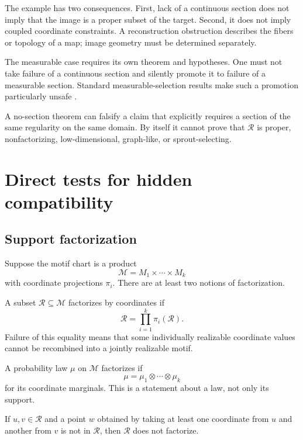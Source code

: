 \documentclass[11pt]{article}
\newcommand{\Image}{\mathcal R}
\newcommand{\Motif}{\mathcal M}
\begin{document}
The example has two consequences.  First, lack of a continuous section does
not imply that the image is a proper subset of the target.  Second, it does
not imply coupled coordinate constraints.  A reconstruction obstruction
describes the fibers or topology of a map; image geometry must be determined
separately.

The measurable case requires its own theorem and hypotheses.  One must not
take failure of a continuous section and silently promote it to failure of a
measurable section.  Standard measurable-selection results make such a
promotion particularly unsafe \cite{kechris1995}.

\begin{corollary}
A no-section theorem can falsify a claim that explicitly requires a section
of the same regularity on the same domain.  By itself it cannot prove that
$\Image$ is proper, nonfactorizing, low-dimensional, graph-like, or
sprout-selecting.
\end{corollary}

\section{Direct tests for hidden compatibility}

\subsection{Support factorization}

Suppose the motif chart is a product
\[
  \Motif=M_1\times\cdots\times M_k
\]
with coordinate projections $\pi_i$.  There are at least two notions of
factorization.

\begin{definition}
A subset $\Image\subseteq\Motif$ factorizes by coordinates if
\[
  \Image=\prod_{i=1}^k\pi_i(\Image).
\]
Failure of this equality means that some individually realizable coordinate
values cannot be recombined into a jointly realizable motif.
\end{definition}

\begin{definition}
A probability law $\mu$ on $\Motif$ factorizes if
\[
  \mu=\mu_1\otimes\cdots\otimes\mu_k
\]
for its coordinate marginals.  This is a statement about a law, not only its
support.
\end{definition}

\begin{proposition}
If $u,v\in\Image$ and a point $w$ obtained by taking at least one coordinate
from $u$ and another from $v$ is not in $\Image$, then $\Image$ does not
factorize.
\end{proposition}
\end{document}
